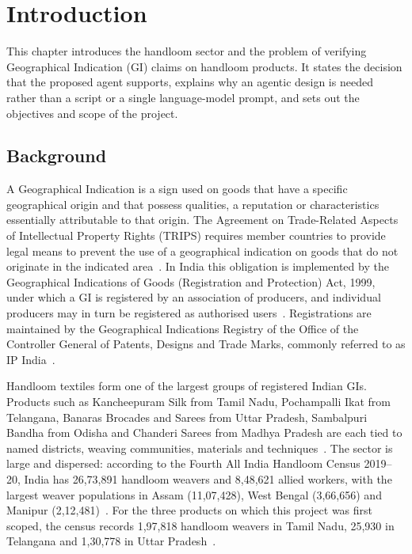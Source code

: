 \chapter{Introduction}

This chapter introduces the handloom sector and the problem of verifying Geographical Indication (GI)
claims on handloom products. It states the decision that the proposed agent supports, explains why an
agentic design is needed rather than a script or a single language-model prompt, and sets out the
objectives and scope of the project.

\section{Background}

A Geographical Indication is a sign used on goods that have a specific geographical origin and that
possess qualities, a reputation or characteristics essentially attributable to that origin. The
Agreement on Trade-Related Aspects of Intellectual Property Rights (TRIPS) requires member countries
to provide legal means to prevent the use of a geographical indication on goods that do not originate
in the indicated area~\cite{trips}. In India this obligation is implemented by the Geographical
Indications of Goods (Registration and Protection) Act, 1999, under which a GI is registered by an
association of producers, and individual producers may in turn be registered as authorised
users~\cite{giact1999}. Registrations are maintained by the Geographical Indications Registry of the
Office of the Controller General of Patents, Designs and Trade Marks, commonly referred to as IP
India~\cite{ipindia}.

Handloom textiles form one of the largest groups of registered Indian GIs. Products such as
Kancheepuram Silk from Tamil Nadu, Pochampalli Ikat from Telangana, Banaras Brocades and Sarees from
Uttar Pradesh, Sambalpuri Bandha from Odisha and Chanderi Sarees from Madhya Pradesh are each tied to
named districts, weaving communities, materials and techniques~\cite{ipindia,pibgi}. The sector is
large and dispersed: according to the Fourth All India Handloom Census 2019--20, India has
26,73,891 handloom weavers and 8,48,621 allied workers, with the largest weaver populations in
Assam (11,07,428), West Bengal (3,66,656) and Manipur (2,12,481)~\cite{pibcensus}. For the three
products on which this project was first scoped, the census records 1,97,818 handloom weavers in
Tamil Nadu, 25,930 in Telangana and 1,30,778 in Uttar Pradesh~\cite{pibcensus}.

